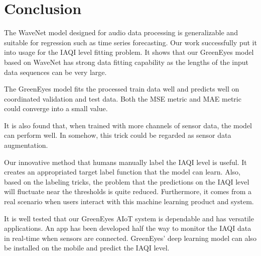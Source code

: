 \chapter{Conclusion}

The WaveNet model designed for audio data processing is generalizable and suitable for regression such as time series forecasting. Our work successfully put it into usage for the IAQI level fitting problem. It shows that our GreenEyes model based on WaveNet has strong data fitting capability as the lengths of the input data sequences can be very large.

The GreenEyes model fits the processed train data well and predicts well on coordinated validation and test data. Both the MSE metric and MAE metric could converge into a small value.

It is also found that, when trained with more channels of sensor data, the model can perform well. In somehow, this trick could be regarded as sensor data augmentation.

Our innovative method that humans manually label the IAQI level is useful. It creates an appropriated target label function that the model can learn. Also, based on the labeling tricks, the problem that the predictions on the IAQI level will fluctuate near the thresholds is quite reduced. Furthermore, it comes from a real scenario when users interact with this machine learning product and system.

It is well tested that our GreenEyes AIoT system is dependable and has versatile applications. An app has been developed half the way to monitor the IAQI data in real-time when sensors are connected. GreenEyes' deep learning model can also be installed on the mobile and predict the IAQI level.